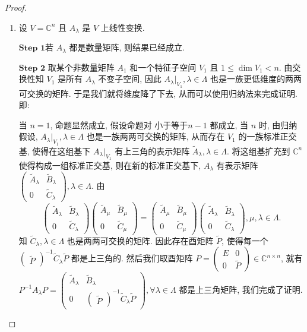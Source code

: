 \documentclass[../../main.tex]{subfiles}
\begin{document}
\begin{proof}
\begin{enumerate}
\item 设 $V = \mathbb{C}^n$ 且 $A_{\lambda}$ 是 $V$ 上线性变换.

$\mathbf{Step}\,\,\mathbf{1}$若 $A_{\lambda}$ 都是数量矩阵, 则结果已经成立.

$\mathbf{Step}\,\,\mathbf{2}$ 取某个非数量矩阵 $A_1$ 和一个特征子空间 $V_1$ 且 $1 \leqslant  \dim V_1 < n$. 由交换性知 $V_1$ 是所有 $A_{\lambda}$ 不变子空间, 因此 $A_{\lambda}|_{V_1}, \lambda \in \Lambda$ 也是一族更低维度的两两可交换的矩阵. 于是我们就将维度降了下去, 从而可以使用归纳法来完成证明. 即:

当 $n = 1$, 命题显然成立, 假设命题对 小于等于$n - 1$ 都成立, 当 $n$ 时, 由归纳假设, $A_{\lambda}|_{V_1}, \lambda \in \Lambda$ 也是一族两两可交换的矩阵, 从而存在 $V_1$ 的一族标准正交基, 使得在这组基下 $A_{\lambda}|_{V_1}$ 有上三角的表示矩阵 $\widetilde{A}_{\lambda}, \lambda \in \Lambda$. 将这组基扩充到 $\mathbb{C}^n$ 使得构成一组标准正交基, 则在新的标准正交基下, $A_{\lambda}$ 有表示矩阵 $\begin{pmatrix} \widetilde{A}_{\lambda} & \widetilde{B}_{\lambda} \\ 0 & \widetilde{C}_{\lambda} \end{pmatrix}, \lambda \in \Lambda$. 由
\[
\begin{pmatrix} \widetilde{A}_{\lambda} & \widetilde{B}_{\lambda} \\ 0 & \widetilde{C}_{\lambda} \end{pmatrix} \begin{pmatrix} \widetilde{A}_{\mu} & \widetilde{B}_{\mu} \\ 0 & \widetilde{C}_{\mu} \end{pmatrix} = \begin{pmatrix} \widetilde{A}_{\mu} & \widetilde{B}_{\mu} \\ 0 & \widetilde{C}_{\mu} \end{pmatrix} \begin{pmatrix} \widetilde{A}_{\lambda} & \widetilde{B}_{\lambda} \\ 0 & \widetilde{C}_{\lambda} \end{pmatrix},\mu,\lambda \in \Lambda.
\]
知 $\widetilde{C}_{\lambda}, \lambda \in \Lambda$ 也是两两可交换的矩阵. 因此存在酉矩阵 $\widetilde{P}$, 使得每一个 $\begin{pmatrix} \widetilde{P} \end{pmatrix}^{-1} \widetilde{C}_{\lambda} \widetilde{P}$ 都是上三角的. 然后我们取酉矩阵 $P = \begin{pmatrix} E & 0 \\ 0 & \widetilde{P} \end{pmatrix} \in \mathbb{C}^{n \times n}$, 就有 $P^{-1}A_{\lambda}P = \begin{pmatrix} \widetilde{A}_{\lambda} & \widetilde{B}_{\lambda} \\ 0 & \begin{pmatrix} \widetilde{P} \end{pmatrix}^{-1} \widetilde{C}_{\lambda} \widetilde{P} \end{pmatrix}, \forall \lambda \in \Lambda$ 都是上三角矩阵, 我们完成了证明.


\end{enumerate}
\end{proof}
\end{document}
